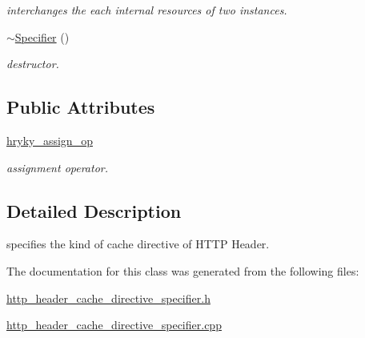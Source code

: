 \begin{DoxyCompactItemize}
\begin{DoxyCompactList}\small\item\em interchanges the each internal resources of two instances. \end{DoxyCompactList}\item 
\hypertarget{classhryky_1_1http_1_1header_1_1cache_1_1directive_1_1_specifier_af6eb2855a2edc6b74402c6c4458251f2}{\hyperlink{classhryky_1_1http_1_1header_1_1cache_1_1directive_1_1_specifier_af6eb2855a2edc6b74402c6c4458251f2}{$\sim$\-Specifier} ()}\label{classhryky_1_1http_1_1header_1_1cache_1_1directive_1_1_specifier_af6eb2855a2edc6b74402c6c4458251f2}

\begin{DoxyCompactList}\small\item\em destructor. \end{DoxyCompactList}\end{DoxyCompactItemize}
\subsection*{Public Attributes}
\begin{DoxyCompactItemize}
\item 
\hypertarget{classhryky_1_1http_1_1header_1_1cache_1_1directive_1_1_specifier_ac1c05a1ac4ae0a66bc10d154c91fc7f4}{\hyperlink{classhryky_1_1http_1_1header_1_1cache_1_1directive_1_1_specifier_ac1c05a1ac4ae0a66bc10d154c91fc7f4}{hryky\-\_\-assign\-\_\-op}}\label{classhryky_1_1http_1_1header_1_1cache_1_1directive_1_1_specifier_ac1c05a1ac4ae0a66bc10d154c91fc7f4}

\begin{DoxyCompactList}\small\item\em assignment operator. \end{DoxyCompactList}\end{DoxyCompactItemize}


\subsection{Detailed Description}
specifies the kind of cache directive of H\-T\-T\-P Header. 

The documentation for this class was generated from the following files\-:\begin{DoxyCompactItemize}
\item 
\hyperlink{http__header__cache__directive__specifier_8h}{http\-\_\-header\-\_\-cache\-\_\-directive\-\_\-specifier.\-h}\item 
\hyperlink{http__header__cache__directive__specifier_8cpp}{http\-\_\-header\-\_\-cache\-\_\-directive\-\_\-specifier.\-cpp}\end{DoxyCompactItemize}
